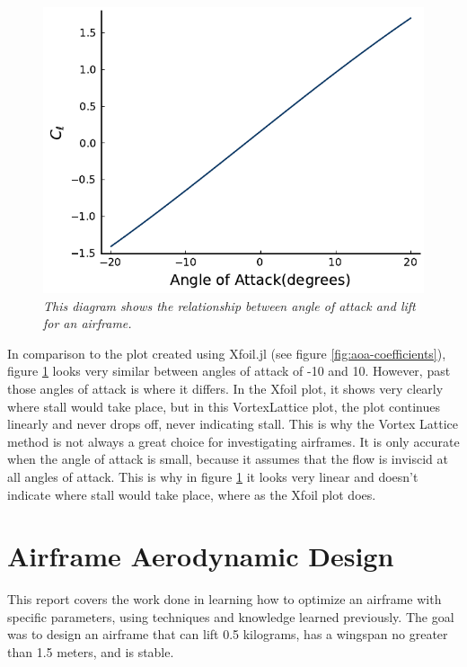 \documentclass{journal}
\begin{document}
	\begin{figure}[H]
		\centering
		\includegraphics{../graphics/aoa-lift.pdf}
		\caption{\emph{This diagram shows the relationship between angle of attack and lift for an airframe.}}
		\label{fig:aoa-lift}
	\end{figure}
	
	In comparison to the plot created using Xfoil.jl (see figure \ref{fig:aoa-coefficients}), figure \ref{fig:aoa-lift} looks very similar between angles of attack of -10 and 10. However, past those angles of attack is where it differs. In the Xfoil plot, it shows very clearly where stall would take place, but in this VortexLattice plot, the plot continues linearly and never drops off, never indicating stall. This is why the Vortex Lattice method is not always a great choice for investigating airframes. It is only accurate when the angle of attack is small, because it assumes that the flow is inviscid at all angles of attack. This is why in figure \ref{fig:aoa-lift} it looks very linear and doesn't indicate where stall would take place, where as the Xfoil plot does.\\
	
	\section{Airframe Aerodynamic Design}
	
	This report covers the work done in learning how to optimize an airframe with specific parameters, using techniques and knowledge learned previously. The goal was to design an airframe that can lift 0.5 kilograms, has a wingspan no greater than 1.5 meters, and is stable.\\
	
\end{document}
